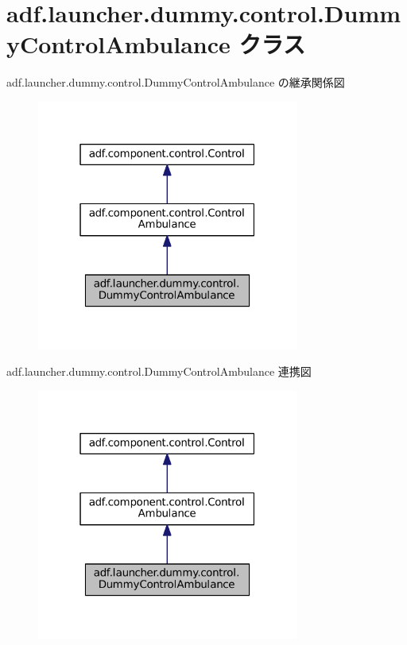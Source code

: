 \hypertarget{classadf_1_1launcher_1_1dummy_1_1control_1_1DummyControlAmbulance}{}\section{adf.\+launcher.\+dummy.\+control.\+Dummy\+Control\+Ambulance クラス}
\label{classadf_1_1launcher_1_1dummy_1_1control_1_1DummyControlAmbulance}


adf.\+launcher.\+dummy.\+control.\+Dummy\+Control\+Ambulance の継承関係図
\nopagebreak
\begin{figure}[H]
\begin{center}
\leavevmode
\includegraphics[width=244pt]{classadf_1_1launcher_1_1dummy_1_1control_1_1DummyControlAmbulance__inherit__graph}
\end{center}
\end{figure}


adf.\+launcher.\+dummy.\+control.\+Dummy\+Control\+Ambulance 連携図
\nopagebreak
\begin{figure}[H]
\begin{center}
\leavevmode
\includegraphics[width=244pt]{classadf_1_1launcher_1_1dummy_1_1control_1_1DummyControlAmbulance__coll__graph}
\end{center}
\end{figure}
